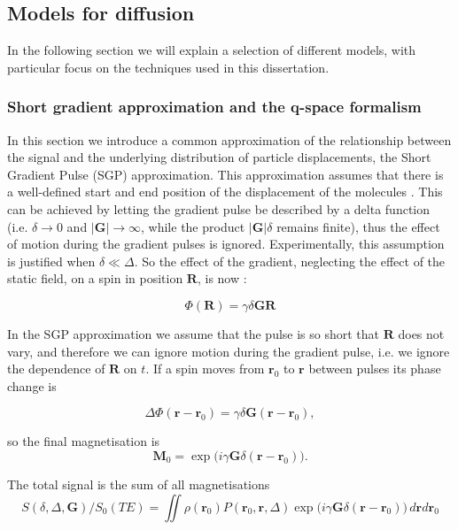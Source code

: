 \subsection*{Models for diffusion}
In the following section we will explain a selection of different models, with particular focus on the techniques used in this dissertation. 
\subsubsection{Short gradient approximation and the q-space formalism}
\label{SGP}
In this section we introduce a common approximation of the relationship between the signal and the underlying distribution of particle displacements, the Short Gradient Pulse (SGP) approximation. This approximation assumes that
there is a well-defined start and end position of the displacement of the molecules \cite{EncSurface}. This can be achieved by letting the gradient pulse be described by a delta function (i.e. $\delta \rightarrow 0 $ and $ |\textbf{G}| \rightarrow \infty$, while the product $ |\textbf{G}|\delta$ remains finite), thus the effect of motion during the gradient pulses is ignored. Experimentally, this assumption is justified when $\delta \ll \Delta$. So the effect of the gradient, neglecting the effect of the static field, on a spin in position $\textbf{R}$,  is now :

\begin{equation}
\Phi(\textbf{R}) = \gamma\delta \textbf{G}\textbf{R}
\label{phasesgp}
\end{equation}

In the SGP approximation we assume that the pulse is so short that $\textbf{R}$ does not vary, and therefore we can ignore motion during the gradient pulse, i.e. we ignore the dependence of  $\textbf{R}$ on $t$. If a spin moves from  $\textbf{r}_{0}$ to  $\textbf{r}$ between pulses its phase change is

\begin{equation}
\Delta\Phi(\textbf{r}-\textbf{r}_{0}) = \gamma\delta \textbf{G}(\textbf{r}-\textbf{r}_{0}),
\label{deltaphasesgp}
\end{equation}

so the final magnetisation is
   \begin{equation}
   \textbf{M}_{0} = \exp\Big(i \gamma \textbf{G} \delta (\textbf{r}-\textbf{r}_{0})\Big).
   \end{equation}

   The total signal is the sum of all magnetisations \cite{Price1}
\begin{equation}
S(\delta,\Delta,\textbf{G})/S_{0}(TE) = \iint \rho(\textbf{r}_{0})P(\textbf{r}_{0},\textbf{r},\Delta)\exp\Big(i \gamma \textbf{G} \delta (\textbf{r}-\textbf{r}_{0}) \Big)\,d\textbf{r} d\textbf{r}_{0}
\label{onedim}
\end{equation}

